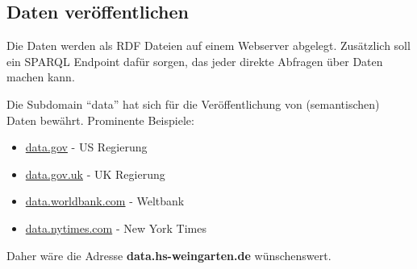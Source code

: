 \subsection{Daten veröffentlichen} 			%
Die Daten werden als RDF Dateien auf einem Webserver abgelegt. Zusätzlich soll ein SPARQL Endpoint dafür sorgen, das jeder direkte Abfragen über Daten machen kann.

Die Subdomain ``data'' hat sich für die Veröffentlichung von (semantischen) Daten bewährt.
Prominente Beispiele:
\begin{itemize}
 \item \href{http://data.gov}{data.gov} - US Regierung
 \item \href{http://data.gov.uk}{data.gov.uk} - UK Regierung
 \item \href{http://data.worldbank.com}{data.worldbank.com} - Weltbank
 \item \href{http://data.nytimes.com}{data.nytimes.com} - New York Times
\end{itemize}

Daher wäre die Adresse \textbf{data.hs-weingarten.de} wünschenswert.

